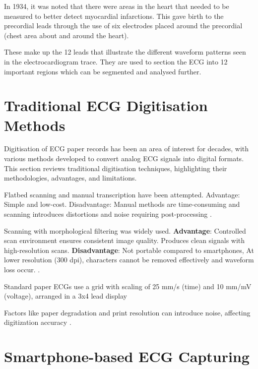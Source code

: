 In 1934, it was noted that there were areas in the heart that needed to be measured to better detect myocardial infarctions. This gave birth to the precordial leads through the use of six electrodes placed around the precordial (chest area about and around the heart). 

These make up the 12 leads that illustrate the different waveform patterns seen in the electrocardiogram trace. They are used to section the ECG into 12 important regions which can be segmented and analysed further. \cite{AlGhatrif2012}


\section{Traditional ECG Digitisation Methods}

Digitisation of ECG paper records has been an area of interest for decades, with various methods developed to convert analog ECG signals into digital formats. This section reviews traditional digitisation techniques, highlighting their methodologies, advantages, and limitations.

Flatbed scanning and manual transcription have been attempted. Advantage: Simple and low-cost. Disadvantage: Manual methods are time-consuming and scanning introduces distortions and noise requiring post-processing \cite{Mishra2021}.

Scanning with morphological filtering was widely used. \textbf{Advantage}: Controlled scan environment ensures consistent image quality. Produces clean signals with high-resolution scans. \textbf{Disadvantage}: Not portable compared to smartphones, At lower resolution (300 dpi), characters cannot be removed effectively and waveform loss occur. \cite{Tun2017}.

Standard paper ECGs use a grid with scaling of 25 mm/s (time) and 10 mm/mV (voltage), arranged in a 3x4 lead display %

Factors like paper degradation and print resolution can introduce noise, affecting digitization accuracy \cite{LI2020104077}.


\section{Smartphone-based ECG Capturing}


